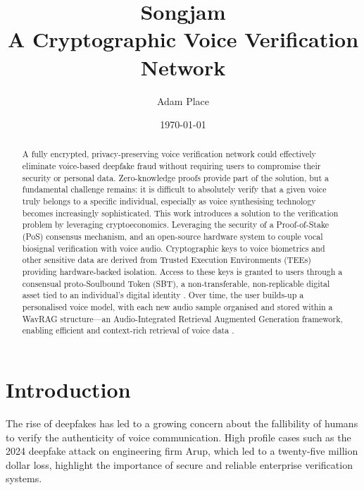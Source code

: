 \documentclass[11pt,a4paper]{article}
\title{Songjam\\[0.5em]\large A Cryptographic Voice Verification Network}
\author{Adam Place}
\date{\today}
\begin{document}
\maketitle
\thispagestyle{fancy} %
\pagestyle{fancy}
\fancyhf{} %
\fancyfoot[L]{\thepage} %
\renewcommand{\headrulewidth}{0pt} %
\renewcommand{\footrulewidth}{0.4pt} %

\begin{abstract}
A fully encrypted, privacy-preserving voice verification network could effectively eliminate voice-based deepfake fraud without requiring users to compromise their security or personal data.
Zero-knowledge proofs provide part of the solution, but a fundamental challenge remains: it is difficult to absolutely verify that a given voice truly belongs to a specific individual, especially as voice synthesising technology becomes increasingly sophisticated.
This work introduces a solution to the verification problem by leveraging cryptoeconomics.
Leveraging the security of a Proof-of-Stake (PoS) consensus mechanism, and an open-source hardware system to couple vocal biosignal verification with voice audio.
Cryptographic keys to voice biometrics and other sensitive data are derived from Trusted Execution Environments (TEEs) providing hardware-backed isolation.
Access to these keys is granted to users through a consensual proto-Soulbound Token (SBT), a non-transferable, non-replicable digital asset tied to an individual's digital identity \cite{buterin2022soulbound}.
Over time, the user builds-up a personalised voice model, with each new audio sample organised and stored within a WavRAG structure---an Audio-Integrated Retrieval Augmented Generation framework, enabling efficient and context-rich retrieval of voice data \cite{chen2025wavrag}.
\end{abstract}

\section{Introduction}
\label{sec:introduction}
The rise of deepfakes has led to a growing concern about the fallibility of humans to verify the authenticity of voice communication.
High profile cases such as the 2024 deepfake attack on engineering firm Arup, which led to a twenty-five million dollar loss, highlight the importance of secure and reliable enterprise verification systems.
\end{document}
